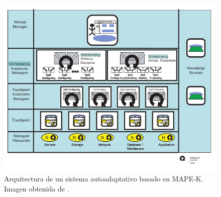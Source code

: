 \begin{figure}[htb]
  \centering
  \includegraphics[scale=0.6]{cap_contexto_tecnologico/images/mape-k-architecture}
  \caption[Arquitectura de un sistema autoadaptativo basado en MAPE-K.]{Arquitectura de un sistema autoadaptativo basado en MAPE-K. Imagen obtenida de \cite{ibmcorporationArchitecturalBlueprintAutonomic2006}.}
  \label{fig:autonomic-system}
\end{figure}
